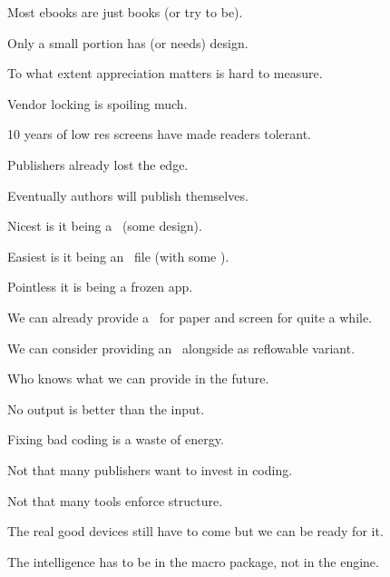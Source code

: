 

\startdocument
  [title=e-books,
   subtitle=old wine in new bottles,
   location=\ConTeXt\ Meeting 2011]


\StartSteps
\startitemize
\item Most ebooks are just books (or try to be). \FlushStep
\item Only a small portion has (or needs) design. \FlushStep
\item To what extent appreciation matters is hard to measure. \FlushStep
\item Vendor locking is spoiling much. \FlushStep
\item 10 years of low res screens have made readers tolerant. \FlushStep
\item Publishers already lost the edge. \FlushStep
\item Eventually authors will publish themselves. \FlushStep
\stopitemize
\StopSteps



\StartSteps
\startitemize
\item Nicest is it being a \PDF\ (some design). \FlushStep
\item Easiest is it being an \XHTML\ file (with some \CSS). \FlushStep
\item Pointless it is being a frozen app. \FlushStep
\item We can already provide a \PDF\ for paper and screen for quite a while. \FlushStep
\item We can consider providing an \XHTML\ alongside as reflowable variant. \FlushStep
\item Who knows what we can provide in the future. \FlushStep
\stopitemize
\StopSteps


\StartSteps
\startitemize
\item No output is better than the input. \FlushStep
\item Fixing bad coding is a waste of energy. \FlushStep
\item Not that many publishers want to invest in coding. \FlushStep
\item Not that many tools enforce structure. \FlushStep
\item The real good devices still have to come but we can be ready for it. \FlushStep
\item The intelligence has to be in the macro package, not in the engine. \FlushStep
\stopitemize
\StopSteps

